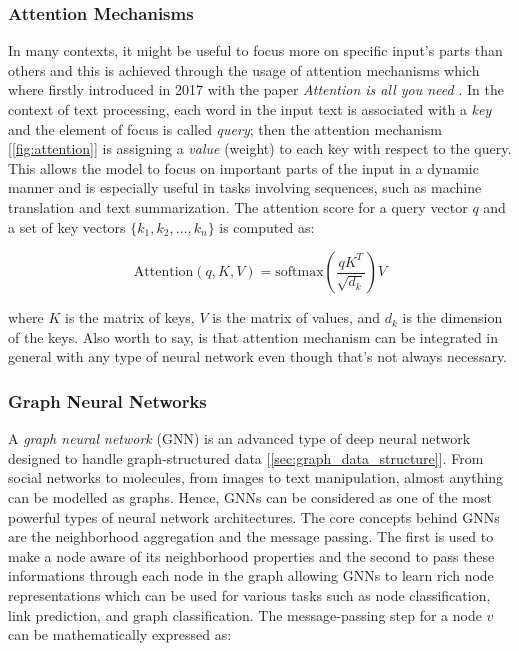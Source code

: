 \documentclass[../Thesis.tex]{subfiles}
\begin{document}
	
	
	\subsubsection{Attention Mechanisms}
	In many contexts, it might be useful to focus more on specific input's parts than others and this is achieved through the usage of attention mechanisms which where firstly introduced in 2017 with the paper \emph{Attention is all you need} \cite{vaswani2023attentionneed}. In the context of text processing, each word in the input text is associated with a \emph{key} and the element of focus is called \emph{query}; then the attention mechanism [\autoref{fig:attention}] is assigning a \emph{value} (weight) to each key with respect to the query. This allows the model to focus on important parts of the input in a dynamic manner and is especially useful in tasks involving sequences, such as machine translation and text summarization. The attention score for a query vector \(q\) and a set of key vectors \(\{k_1, k_2, \ldots, k_n\}\) is computed as:
	
	\[
	\text{Attention}(q, K, V) = \text{softmax} \left( \frac{qK^T}{\sqrt{d_k}} \right) V
	\]
	
	where \(K\) is the matrix of keys, \(V\) is the matrix of values, and \(d_k\) is the dimension of the keys. Also worth to say, is that attention mechanism can be integrated in general with any type of neural network even though that's not always necessary.
	
	
	
	
	\subsubsection{Graph Neural Networks}
	A \emph{graph neural network} (GNN) is an advanced type of deep neural network designed to handle graph-structured data [\autoref{sec:graph_data_structure}]. From social networks to molecules, from images to text manipulation, almost anything can be modelled as graphs. Hence, GNNs can be considered as one of the most powerful types of neural network architectures. The core concepts behind GNNs are the neighborhood aggregation and the message passing. The first is used to make a node aware of its neighborhood properties and the second to pass these informations through each node in the graph allowing GNNs to learn rich node representations which can be used for various tasks such as node classification, link prediction, and graph classification. The message-passing step for a node \(v\) can be mathematically expressed as:
	
\end{document}
